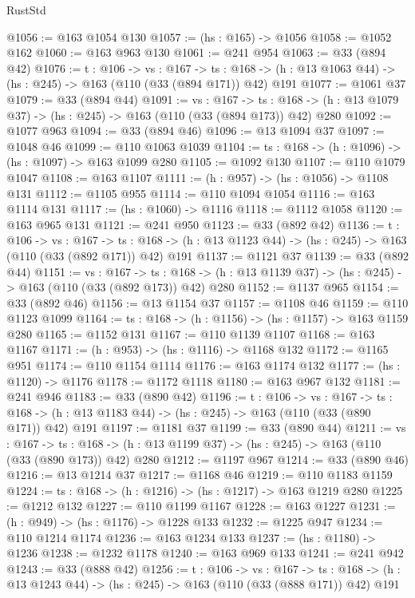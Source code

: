 \begin{lexlean}{RustStd}
\begin{coremodule}
{\begin{coremodule}
{{{@1056 := @163 @1054 @130
@1057 := (hs : @165) -> @1056
@1058 := @1052 @162
@1060 := @163 @963 @130
@1061 := @241 @954
@1063 := @33 (@894 @42)
@1076 := {t : @106} ->
  {vs : @167} ->
  {ts : @168} -> (h : @13 @1063 @44) -> (hs : @245) -> @163 (@110 (@33 (@894 @171)) @42) @191
@1077 := @1061 @37
@1079 := @33 (@894 @44)
@1091 := {vs : @167} ->
  {ts : @168} -> (h : @13 @1079 @37) -> (hs : @245) -> @163 (@110 (@33 (@894 @173)) @42) @280
@1092 := @1077 @963
@1094 := @33 (@894 @46)
@1096 := @13 @1094 @37
@1097 := @1048 @46
@1099 := @110 @1063 @1039
@1104 := {ts : @168} -> (h : @1096) -> (hs : @1097) -> @163 @1099 @280
@1105 := @1092 @130
@1107 := @110 @1079 @1047
@1108 := @163 @1107
@1111 := (h : @957) -> (hs : @1056) -> @1108 @131
@1112 := @1105 @955
@1114 := @110 @1094 @1054
@1116 := @163 @1114 @131
@1117 := (hs : @1060) -> @1116
@1118 := @1112 @1058
@1120 := @163 @965 @131
@1121 := @241 @950
@1123 := @33 (@892 @42)
@1136 := {t : @106} ->
  {vs : @167} ->
  {ts : @168} -> (h : @13 @1123 @44) -> (hs : @245) -> @163 (@110 (@33 (@892 @171)) @42) @191
@1137 := @1121 @37
@1139 := @33 (@892 @44)
@1151 := {vs : @167} ->
  {ts : @168} -> (h : @13 @1139 @37) -> (hs : @245) -> @163 (@110 (@33 (@892 @173)) @42) @280
@1152 := @1137 @965
@1154 := @33 (@892 @46)
@1156 := @13 @1154 @37
@1157 := @1108 @46
@1159 := @110 @1123 @1099
@1164 := {ts : @168} -> (h : @1156) -> (hs : @1157) -> @163 @1159 @280
@1165 := @1152 @131
@1167 := @110 @1139 @1107
@1168 := @163 @1167
@1171 := (h : @953) -> (hs : @1116) -> @1168 @132
@1172 := @1165 @951
@1174 := @110 @1154 @1114
@1176 := @163 @1174 @132
@1177 := (hs : @1120) -> @1176
@1178 := @1172 @1118
@1180 := @163 @967 @132
@1181 := @241 @946
@1183 := @33 (@890 @42)
@1196 := {t : @106} ->
  {vs : @167} ->
  {ts : @168} -> (h : @13 @1183 @44) -> (hs : @245) -> @163 (@110 (@33 (@890 @171)) @42) @191
@1197 := @1181 @37
@1199 := @33 (@890 @44)
@1211 := {vs : @167} ->
  {ts : @168} -> (h : @13 @1199 @37) -> (hs : @245) -> @163 (@110 (@33 (@890 @173)) @42) @280
@1212 := @1197 @967
@1214 := @33 (@890 @46)
@1216 := @13 @1214 @37
@1217 := @1168 @46
@1219 := @110 @1183 @1159
@1224 := {ts : @168} -> (h : @1216) -> (hs : @1217) -> @163 @1219 @280
@1225 := @1212 @132
@1227 := @110 @1199 @1167
@1228 := @163 @1227
@1231 := (h : @949) -> (hs : @1176) -> @1228 @133
@1232 := @1225 @947
@1234 := @110 @1214 @1174
@1236 := @163 @1234 @133
@1237 := (hs : @1180) -> @1236
@1238 := @1232 @1178
@1240 := @163 @969 @133
@1241 := @241 @942
@1243 := @33 (@888 @42)
@1256 := {t : @106} ->
  {vs : @167} ->
  {ts : @168} -> (h : @13 @1243 @44) -> (hs : @245) -> @163 (@110 (@33 (@888 @171)) @42) @191
}}}
\end{coremodule}}
\end{coremodule}
\end{lexlean}
